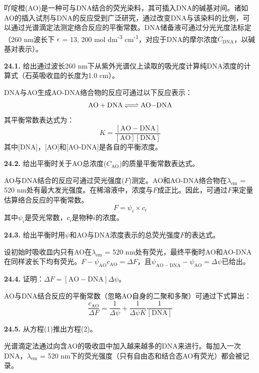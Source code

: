 吖啶橙(AO)是一种可与DNA结合的荧光染料，其可插入DNA的碱基对间。诸如AO的插入试剂与DNA的反应受到广泛研究，通过改变DNA与该染料的比例，可以通过光谱滴定法测定络合反应的平衡常数。DNA储备液可通过分光光度法标定（260 nm波长下 $\epsilon$ = 13, 200 mol dm\textsuperscript{-3} cm\textsuperscript{-1}，对应于DNA的摩尔浓度$C_\mathrm{DNA}$，以碱基对表示）。

\noindent\textbf{24.1.}
给出通过波长260 nm下从紫外光谱仪上读取的吸光度计算纯DNA浓度的计算式（石英吸收皿的长度为1.0 cm）。

DNA与AO生成AO-DNA络合物的反应可通过以下反应表示：
\[\ce{AO + DNA <=> AO-DNA}\]
\noindent 其平衡常数表达式为：
\begin{equation}
    K = \frac{[\mathrm{AO-DNA}]}{[\mathrm{AO}][\mathrm{DNA}]}
\end{equation}
\noindent 其中[DNA]，[AO]和[AO-DNA]是各自的平衡浓度。

\noindent\textbf{24.2.}
给出平衡时关于AO总浓度($C_\mathrm{AO}$)的质量平衡常数表达式。

AO与DNA结合的反应可通过荧光强度(\(F\))测定。AO和AO-DNA络合物在$\lambda_\mathrm{em}$ = 520 nm处有最大发光强度。在稀溶液中，浓度与\(F\)成正比。因此，可通过\(F\)来定量估算络合反应的平衡常数。
\[F=\psi_i\times c_i\]
\noindent 其中$\psi_i$是荧光常数，$c_i$是物种\(i\)的浓度。

\noindent\textbf{24.3.}
给出平衡时用\(\psi\)和AO与DNA浓度表示的总荧光强度\(F\)的表达式。

设初始时吸收皿内只有AO在$\lambda_\mathrm{em}$ = 520 nm处有荧光，最终平衡时AO和AO-DNA在同样波长下均有荧光。$F - \psi_\mathrm{AO}c_\mathrm{AO} = \Delta  F$，且$\psi_\mathrm{AO−DNA} - \psi_\mathrm{AO} = \Delta  \psi$已给出。

\noindent\textbf{24.4.}
证明：$\Delta  F = [\mathrm{AO-DNA}]\Delta  \psi$。

AO与DNA结合反应的平衡常数（忽略AO自身的二聚和多聚）可通过下式算出：
\begin{equation}
    \frac{c_\mathrm{AO}}{\Delta F} = \frac{1}{\Delta \psi} + \frac{1}{\Delta \psi K}\frac{1}{[\mathrm{DNA}]}
\end{equation}

\noindent\textbf{24.5.}
从方程(1)推出方程(2)。

光谱滴定法通过向含AO的吸收皿中加入越来越多的DNA来进行。每加入一次DNA，$\lambda_\mathrm{em}$ = 520 nm下的荧光强度（只有自由态和结合态AO有荧光）都会被记录。

